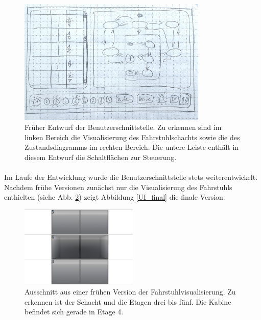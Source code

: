\begin{figure}[h!]
	\centering
	\includegraphics[width=0.8\textwidth]{images/Entwurf_UI}
	\caption{Früher Entwurf der Benutzerschnittstelle. Zu erkennen sind im linken Bereich die Visualisierung des Fahrstuhlschachts sowie die des Zustandsdiagramms im rechten Bereich. Die untere Leiste enthält in diesem Entwurf die Schaltflächen zur Steuerung.}
	\label{Entwurf_UI}
\end{figure}

\hspace*{1.5cm}
\paragraph{}Im Laufe der Entwicklung wurde die Benutzerschnittstelle stets weiterentwickelt. Nachdem frühe Versionen zunächst nur die Visualisierung des Fahrstuhls enthielten (siehe Abb. \ref{UI_ealry}) zeigt Abbildung \ref{UI_final} die finale Version.

\hspace*{2cm}
\begin{figure}[h!]
	\centering
	\includegraphics[width=0.5\textwidth]{images/UI_frueh.png}
	\caption{Ausschnitt aus einer frühen Version der Fahrstuhlvisualisierung. Zu erkennen ist der Schacht und die Etagen drei bis fünf. Die Kabine befindet sich gerade in Etage 4.}
	\label{UI_ealry}
\end{figure}

